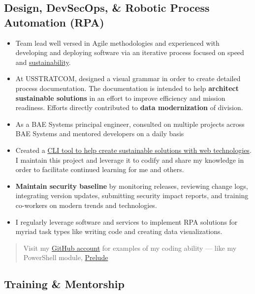 \documentclass[10pt]{article}
\def\tightlist{}
\begin{document}
\hypertarget{design-devsecops-robotic-process-automation-rpa}{%
\subsection{Design, DevSecOps, \& Robotic Process Automation
(RPA)}\label{design-devsecops-robotic-process-automation-rpa}}

\begin{itemize}
\tightlist
\item
  Team lead well versed in Agile methodologies and experienced with
  developing and deploying software via an iterative process focused on
  speed and \href{http://sustainable.surge.sh/}{sustainability}.
\item
  At USSTRATCOM, designed a visual grammar in order to create detailed
  process documentation. The documentation is intended to help
  \textbf{architect sustainable solutions} in an effort to improve
  efficiency and mission readiness. Efforts directly contributed to
  \textbf{data modernization} of division.
\item
  As a BAE Systems principal engineer, consulted on multiple projects
  across BAE Systems and mentored developers on a daily basis
\item
  Created a \href{https://github.com/jhwohlgemuth/tomo-cli}{CLI tool to
  help create sustainable solutions with web technologies}. I maintain
  this project and leverage it to codify and share my knowledge in order
  to facilitate continued learning for me and others.
\item
  \textbf{Maintain security baseline} by monitoring releases, reviewing
  change logs, integrating version updates, submitting security impact
  reports, and training co-workers on modern trends and technologies.
\item
  I regularly leverage software and services to implement RPA solutions
  for myriad task types like writing code and creating data
  visualizations.
\end{itemize}

\begin{quote}
Visit my \href{https://github.com/jhwohlgemuth}{GitHub account} for
examples of my coding ability --- like my PowerShell module,
\href{https://github.com/jhwohlgemuth/pwsh-prelude}{Prelude}
\end{quote}

\hypertarget{training-mentorship}{%
\subsection{Training \& Mentorship}\label{training-mentorship}}
\end{document}
